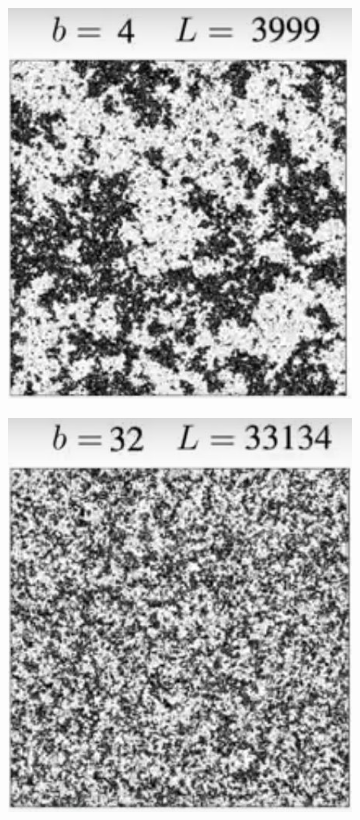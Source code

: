 \documentclass[]{article}
\begin{document}
\begin{figure}[H]
\begin{subfigure}[t]{0.3\textwidth}
		\includegraphics[width=\textwidth]{DouglasAshton2-2}
	\end{subfigure}
	\begin{subfigure}[t]{0.3\textwidth}
		\includegraphics[width=\textwidth]{DouglasAshton2-3}
	\end{subfigure}
\end{figure}
\end{document}
